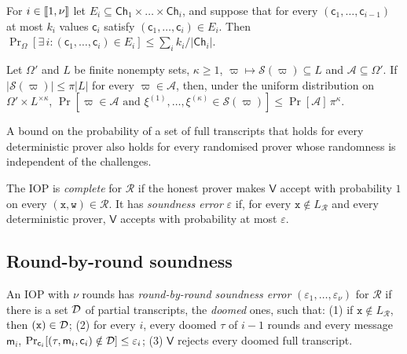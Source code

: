 \begin{lemma}\label{lem:sequential}
For $i \in \llbracket 1, \nu \rrbracket$ let $E_i \subseteq \mathsf{Ch}_1\times\dots\times\mathsf{Ch}_i$, and suppose that for every $(\mathsf{c}_1,\dots,\mathsf{c}_{i-1})$ at most $k_i$ values $\mathsf{c}_i$ satisfy $(\mathsf{c}_1,\dots,\mathsf{c}_i) \in E_i$.
Then $\Pr_\Omega[\exists\, i : (\mathsf{c}_1,\dots,\mathsf{c}_i) \in E_i] \le \sum_{i} k_i/|\mathsf{Ch}_i|$.
\end{lemma}

\begin{lemma}\label{lem:queries}
Let $\Omega'$ and $L$ be finite nonempty sets, $\kappa \ge 1$, $\varpi \mapsto \mathcal{S}(\varpi) \subseteq L$ and $\mathcal{A} \subseteq \Omega'$.
If $|\mathcal{S}(\varpi)| \le \pi |L|$ for every $\varpi \in \mathcal{A}$, then, under the uniform distribution on $\Omega' \times L^{\times\kappa}$,
$\Pr[\varpi \in \mathcal{A} \text{ and } \xi^{(1)},\dots,\xi^{(\kappa)} \in \mathcal{S}(\varpi)] \le \Pr[\mathcal{A}]\,\pi^\kappa$.
\end{lemma}

\begin{lemma}\label{lem:randomised}
A bound on the probability of a set of full transcripts that holds for every deterministic prover also holds for every randomised prover whose randomness is independent of the challenges.
\end{lemma}

\begin{definition}\label{def:iop-sound}
The IOP is \emph{complete} for $\mathcal{R}$ if the honest prover makes $\mathsf{V}$ accept with probability $1$ on every $(\mathtt{x},\mathtt{w}) \in \mathcal{R}$.
It has \emph{soundness error} $\varepsilon$ if, for every $\mathtt{x} \notin L_{\mathcal{R}}$ and every deterministic prover, $\mathsf{V}$ accepts with probability at most $\varepsilon$.
\end{definition}

\subsection{Round-by-round soundness}\label{sec:proofs:rbr}

\begin{definition}\label{def:rbr}
An IOP with $\nu$ rounds has \emph{round-by-round soundness error} $(\varepsilon_1,\dots,\varepsilon_\nu)$ for $\mathcal{R}$ if there is a set $\mathcal{D}$ of partial transcripts, the \emph{doomed} ones, such that:
(1) if $\mathtt{x} \notin L_{\mathcal{R}}$, then $(\mathtt{x}) \in \mathcal{D}$;
(2) for every $i$, every doomed $\tau$ of $i-1$ rounds and every message $\mathsf{m}_i$, $\Pr_{\mathsf{c}_i}[(\tau,\mathsf{m}_i,\mathsf{c}_i) \notin \mathcal{D}] \le \varepsilon_i$;
(3) $\mathsf{V}$ rejects every doomed full transcript.
\end{definition}

